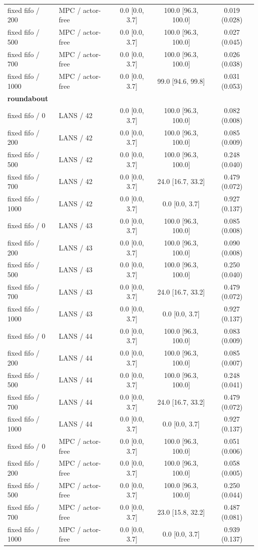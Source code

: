 \begin{longtable}{llccc}
fixed fifo / 200 & MPC / actor-free & 0.0 [0.0, 3.7] & 100.0 [96.3, 100.0] & 0.019 (0.028) \\
fixed fifo / 500 & MPC / actor-free & 0.0 [0.0, 3.7] & 100.0 [96.3, 100.0] & 0.027 (0.045) \\
fixed fifo / 700 & MPC / actor-free & 0.0 [0.0, 3.7] & 100.0 [96.3, 100.0] & 0.026 (0.038) \\
fixed fifo / 1000 & MPC / actor-free & 0.0 [0.0, 3.7] & 99.0 [94.6, 99.8] & 0.031 (0.053) \\
\multicolumn{5}{l}{\textbf{roundabout}} \\
fixed fifo / 0 & LANS / 42 & 0.0 [0.0, 3.7] & 100.0 [96.3, 100.0] & 0.082 (0.008) \\
fixed fifo / 200 & LANS / 42 & 0.0 [0.0, 3.7] & 100.0 [96.3, 100.0] & 0.085 (0.009) \\
fixed fifo / 500 & LANS / 42 & 0.0 [0.0, 3.7] & 100.0 [96.3, 100.0] & 0.248 (0.040) \\
fixed fifo / 700 & LANS / 42 & 0.0 [0.0, 3.7] & 24.0 [16.7, 33.2] & 0.479 (0.072) \\
fixed fifo / 1000 & LANS / 42 & 0.0 [0.0, 3.7] & 0.0 [0.0, 3.7] & 0.927 (0.137) \\
fixed fifo / 0 & LANS / 43 & 0.0 [0.0, 3.7] & 100.0 [96.3, 100.0] & 0.085 (0.008) \\
fixed fifo / 200 & LANS / 43 & 0.0 [0.0, 3.7] & 100.0 [96.3, 100.0] & 0.090 (0.008) \\
fixed fifo / 500 & LANS / 43 & 0.0 [0.0, 3.7] & 100.0 [96.3, 100.0] & 0.250 (0.040) \\
fixed fifo / 700 & LANS / 43 & 0.0 [0.0, 3.7] & 24.0 [16.7, 33.2] & 0.479 (0.072) \\
fixed fifo / 1000 & LANS / 43 & 0.0 [0.0, 3.7] & 0.0 [0.0, 3.7] & 0.927 (0.137) \\
fixed fifo / 0 & LANS / 44 & 0.0 [0.0, 3.7] & 100.0 [96.3, 100.0] & 0.083 (0.009) \\
fixed fifo / 200 & LANS / 44 & 0.0 [0.0, 3.7] & 100.0 [96.3, 100.0] & 0.085 (0.007) \\
fixed fifo / 500 & LANS / 44 & 0.0 [0.0, 3.7] & 100.0 [96.3, 100.0] & 0.248 (0.041) \\
fixed fifo / 700 & LANS / 44 & 0.0 [0.0, 3.7] & 24.0 [16.7, 33.2] & 0.479 (0.072) \\
fixed fifo / 1000 & LANS / 44 & 0.0 [0.0, 3.7] & 0.0 [0.0, 3.7] & 0.927 (0.137) \\
fixed fifo / 0 & MPC / actor-free & 0.0 [0.0, 3.7] & 100.0 [96.3, 100.0] & 0.051 (0.006) \\
fixed fifo / 200 & MPC / actor-free & 0.0 [0.0, 3.7] & 100.0 [96.3, 100.0] & 0.058 (0.005) \\
fixed fifo / 500 & MPC / actor-free & 0.0 [0.0, 3.7] & 100.0 [96.3, 100.0] & 0.250 (0.044) \\
fixed fifo / 700 & MPC / actor-free & 0.0 [0.0, 3.7] & 23.0 [15.8, 32.2] & 0.487 (0.081) \\
fixed fifo / 1000 & MPC / actor-free & 0.0 [0.0, 3.7] & 0.0 [0.0, 3.7] & 0.939 (0.137) \\
\bottomrule
\end{longtable}
